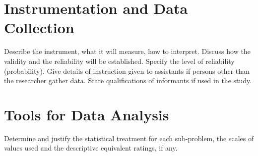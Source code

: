 \section{Instrumentation and Data Collection}
Describe the instrument, what it will measure, how to interpret. Discuss how the validity and the reliability will be established. Specify the level of reliability (probability). Give details of instruction given to assistants if persons other than the researcher gather data. State qualifications of informants if used in the study.

\section{Tools for Data Analysis}
Determine and justify the statistical treatment for each sub-problem, the scales of values used and the descriptive equivalent ratings, if any.
